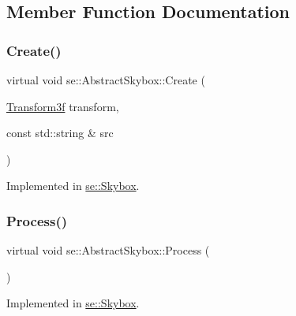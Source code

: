 \subsection{Member Function Documentation}
\mbox{\label{classse_1_1_abstract_skybox_ad9c98023e2ae2cfbb6c84929a1b9f46b}} 
\subsubsection{\texorpdfstring{Create()}{Create()}}
{\footnotesize\ttfamily virtual void se\+::\+Abstract\+Skybox\+::\+Create (\begin{DoxyParamCaption}\item[{\mbox{\hyperlink{classse_1_1_transform3f}{Transform3f}}}]{transform,  }\item[{const std\+::string \&}]{src }\end{DoxyParamCaption})\hspace{0.3cm}{\ttfamily [pure virtual]}}



Implemented in \mbox{\hyperlink{classse_1_1_skybox_a224bf849fd73b70f59613ebd572fd2ff}{se\+::\+Skybox}}.

\mbox{\label{classse_1_1_abstract_skybox_a652add712c92f3d7ebe7f82dc353fa1c}} 
\subsubsection{\texorpdfstring{Process()}{Process()}}
{\footnotesize\ttfamily virtual void se\+::\+Abstract\+Skybox\+::\+Process (\begin{DoxyParamCaption}{ }\end{DoxyParamCaption})\hspace{0.3cm}{\ttfamily [pure virtual]}}



Implemented in \mbox{\hyperlink{classse_1_1_skybox_acd2b0707c02b2a9ac48bcdd79608801c}{se\+::\+Skybox}}.

\mbox{\label{classse_1_1_abstract_skybox_a5aa158b7db1140ffc5c696347f32e2ef}} 
